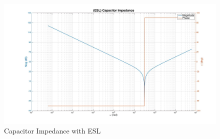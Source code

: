 \begin{figure}[ht!]
\includegraphics[keepaspectratio=true,width=6in]{./figures/parameters/eslImp.jpg}
\centering
\caption{Capacitor Impedance with ESL}
\label{fig:eslPlot}
\end{figure}
